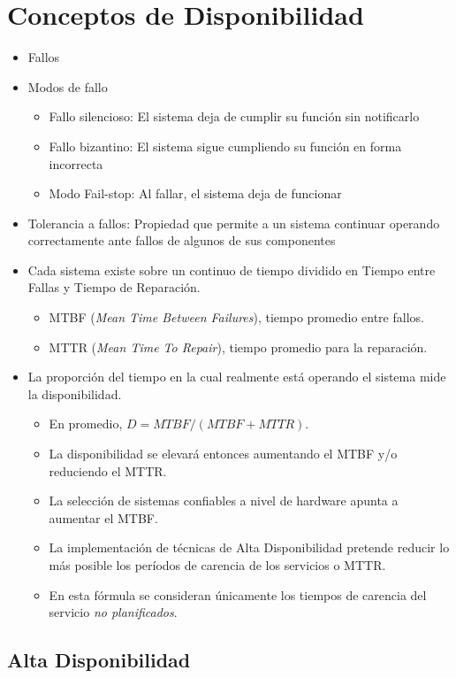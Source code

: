 \section{Conceptos de Disponibilidad}
\begin{itemize}
	\item Fallos
	\item Modos de fallo
	\begin{itemize}
		\item Fallo silencioso: El sistema deja de cumplir su función sin notificarlo
		\item Fallo bizantino: El sistema sigue cumpliendo su función en forma incorrecta
		\item Modo Fail-stop: Al fallar, el sistema deja de funcionar
	\end{itemize}
	\item Tolerancia a fallos: Propiedad que permite a un sistema continuar operando correctamente ante fallos de algunos de sus componentes	
	\item Cada sistema existe sobre un continuo de tiempo dividido en Tiempo entre Fallas y Tiempo de Reparación. 
	\begin{itemize}
		\item MTBF (\textit{Mean Time Between Failures}), tiempo promedio entre fallos.
		\item MTTR (\textit{Mean Time To Repair}), tiempo promedio para la reparación.
	\end{itemize}
	\item La proporción del tiempo en la cual realmente está operando el sistema mide la disponibilidad. 
	\begin{itemize}
		\item En promedio, $D = MTBF / (MTBF + MTTR)$.
		\item La disponibilidad se elevará entonces aumentando el MTBF y/o reduciendo el MTTR. 
		\item La selección de sistemas confiables a nivel de hardware apunta a aumentar el MTBF. 
		\item La implementación de técnicas de Alta Disponibilidad pretende reducir lo más posible los períodos de carencia de los servicios o MTTR. 
		\item En esta fórmula se consideran únicamente los tiempos de carencia del servicio \textit{no planificados}.
	\end{itemize}
\end{itemize}


\subsection{Alta Disponibilidad}

